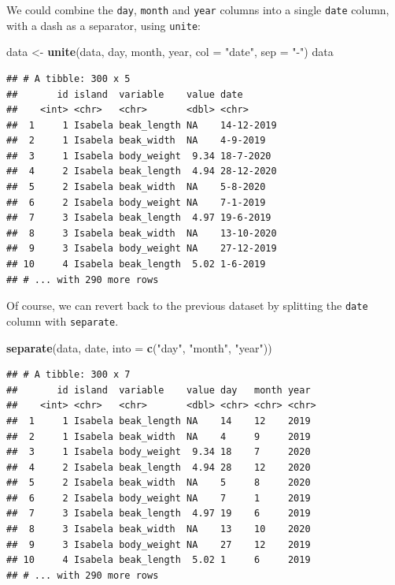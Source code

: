 \documentclass[]{book}
\newenvironment{Shaded}{}{}
\newcommand{\DataTypeTok}[1]{\textcolor[rgb]{0.56,0.13,0.00}{#1}}
\newcommand{\KeywordTok}[1]{\textcolor[rgb]{0.00,0.44,0.13}{\textbf{#1}}}
\newcommand{\NormalTok}[1]{#1}
\newcommand{\StringTok}[1]{\textcolor[rgb]{0.25,0.44,0.63}{#1}}
\begin{document}
We could combine the \texttt{day}, \texttt{month} and \texttt{year} columns into a single \texttt{date} column, with a dash as a separator, using \texttt{unite}:

\begin{Shaded}
\begin{Highlighting}[]
\NormalTok{data <-}\StringTok{ }\KeywordTok{unite}\NormalTok{(data, day, month, year, }\DataTypeTok{col =} \StringTok{"date"}\NormalTok{, }\DataTypeTok{sep =} \StringTok{"-"}\NormalTok{)}
\NormalTok{data}
\end{Highlighting}
\end{Shaded}

\begin{verbatim}
## # A tibble: 300 x 5
##       id island  variable    value date      
##    <int> <chr>   <chr>       <dbl> <chr>     
##  1     1 Isabela beak_length NA    14-12-2019
##  2     1 Isabela beak_width  NA    4-9-2019  
##  3     1 Isabela body_weight  9.34 18-7-2020 
##  4     2 Isabela beak_length  4.94 28-12-2020
##  5     2 Isabela beak_width  NA    5-8-2020  
##  6     2 Isabela body_weight NA    7-1-2019  
##  7     3 Isabela beak_length  4.97 19-6-2019 
##  8     3 Isabela beak_width  NA    13-10-2020
##  9     3 Isabela body_weight NA    27-12-2019
## 10     4 Isabela beak_length  5.02 1-6-2019  
## # ... with 290 more rows
\end{verbatim}

Of course, we can revert back to the previous dataset by splitting the \texttt{date} column with \texttt{separate}.

\begin{Shaded}
\begin{Highlighting}[]
\KeywordTok{separate}\NormalTok{(data, date, }\DataTypeTok{into =} \KeywordTok{c}\NormalTok{(}\StringTok{"day"}\NormalTok{, }\StringTok{"month"}\NormalTok{, }\StringTok{"year"}\NormalTok{))}
\end{Highlighting}
\end{Shaded}

\begin{verbatim}
## # A tibble: 300 x 7
##       id island  variable    value day   month year 
##    <int> <chr>   <chr>       <dbl> <chr> <chr> <chr>
##  1     1 Isabela beak_length NA    14    12    2019 
##  2     1 Isabela beak_width  NA    4     9     2019 
##  3     1 Isabela body_weight  9.34 18    7     2020 
##  4     2 Isabela beak_length  4.94 28    12    2020 
##  5     2 Isabela beak_width  NA    5     8     2020 
##  6     2 Isabela body_weight NA    7     1     2019 
##  7     3 Isabela beak_length  4.97 19    6     2019 
##  8     3 Isabela beak_width  NA    13    10    2020 
##  9     3 Isabela body_weight NA    27    12    2019 
## 10     4 Isabela beak_length  5.02 1     6     2019 
## # ... with 290 more rows
\end{verbatim}
\end{document}
